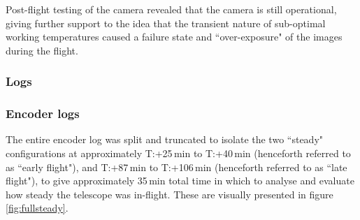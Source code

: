 {Post-flight testing of the camera revealed that the camera is still operational, giving further support to the idea that the transient nature of sub-optimal working temperatures caused a failure state and ``over-exposure" of the images during the flight. 

\newpage
\subsubsection{Logs}

\subsubsection*{Encoder logs}
The entire encoder log was split and truncated to isolate the two ``steady" configurations at approximately T:+25\,min to T:+40\,min (henceforth referred to as ``early flight"), and T:+87\,min to T:+106\,min (henceforth referred to as ``late flight"), to give approximately 35\,min total time in which to analyse and evaluate how steady the telescope was in-flight. These are visually presented in figure \ref{fig:fullsteady}.

}
